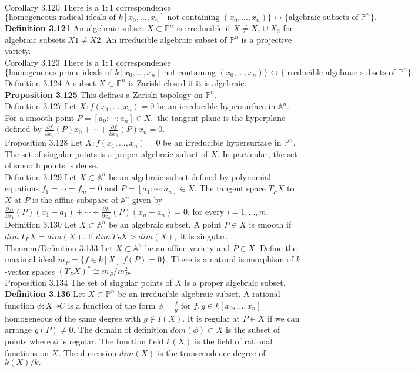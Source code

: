 \documentclass[8pt]{extarticle}
\begin{document}
Corollary 3.120 There is a $1:1$ correspondence $\{\text{homogeneous radical ideals of $k[x_0,..., x_n]$ not containing $(x_0,..., x_n)$}\} \leftrightarrow 
\{\text{algebraic subsets of } \mathbb{P}^n\}.$\\
\textbf{Definition 3.121} An algebraic subset $X \subset \mathbb{P}^n$ is irreducible if $X \neq X_1 \cup X_2$ for algebraic subsets $X1 \neq X2.$ An irreducible algebraic subset of $\mathbb{P}^n$ is a projective variety.\\
Corollary 3.123 There is a $1:1$ correspondence
$\{\text{homogeneous prime ideals of}\,\, k[x_0,..., x_n]\,\, \text{not containing}\,\, (x_0,..., x_n)\}\leftrightarrow \{\text{irreducible algebraic subsets of}\,\, \mathbb{P}^n\}.$\\
Definition 3.124 A subset $X \subset \mathbb{P}^n$ is Zariski closed if it is algebraic.\\
\textbf{Proposition 3.125} This defines a Zariski topology on $\mathbb{P}^n.$\\
Definition 3.127 Let $X:f(x_1,...,x_n)=0$ be an irreducible hypersurface in $\mathbb{A}^n.$ For a smooth point $P=[a_0:\cdots:a_n]\in X,$ the tangent plane is the hyperplane defined by $\frac{\partial f}{\partial x_0}(P)x_0+\cdots+\frac{\partial f}{\partial x_n}(P)x_n=0.$\\
Proposition 3.128 Let $X:f(x_1,...,x_n)=0$ be an irreducible hypersurface in $\mathbb{P}^n.$ The set of singular points is a proper algebraic subset of $X.$ In particular, the set of smooth points is dense.\\
Definition 3.129 Let $X\subset \mathbb{A}^n$ be an algebraic subset defined by polynomial equations $f_1=\cdots=f_m=0$ and $P=[a_1:\cdots:a_n]\in X.$ The tangent space $T_PX$ to $X$ at $P$ is the affine subspace of $\mathbb{A}^n$ given by $\frac{\partial f_i}{\partial x_1}(P)(x_1-a_1)+\cdots+\frac{\partial f_i}{\partial x_n}(P)(x_n-a_n)=0.$ for every $i=1,...,m.$\\
Definition 3.130 Let $X\subset \mathbb{A}^n$ be an algebraic subset. A point $P\in X$ is smooth if $dim\,T_PX=dim(X).$ If $dim\,T_PX>dim(X),$ it is singular. \\
Theorem/Definition 3.133 Let $X\subset \mathbb{A}^n$ be an affine variety and $P\in X.$ Define the maximal ideal $m_P=\{f\in k[X]|f(P)=0\}.$ There is a natural isomorphism of $k$-vector spaces $(T_PX)^*\cong m_P/m^2_P.$\\
Proposition 3.134 The set of singular points of $X$ is a proper algebraic subset.\\
\textbf{Definition 3.136} Let $X \subset \mathbb{P}^n$ be an irreducible algebraic subset. A rational function $\phi: X \dashrightarrow C$ is a function of the form $\phi=\frac{f}{g}$ for $f,g \in k[x_0,...,x_n]$ homogeneous of the same degree with $g \not\in I(X).$ It is regular at $P \in X$ if we can arrange $g(P)\neq 0.$ The domain of definition $dom(\phi) \subset X$ is the subset of points where $\phi$ is regular. The function field $k(X)$ is the field of rational functions on $X.$ The dimension $dim(X)$ is the transcendence degree of $k(X)/k.$\\
\end{document}
